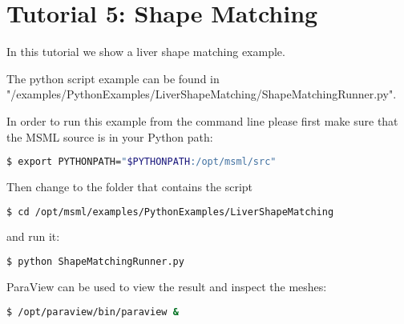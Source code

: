 \chapter{Tutorial 5: Shape Matching}

In this tutorial we show a liver shape matching example.

The python script example can be found in "/examples/PythonExamples/LiverShapeMatching/ShapeMatchingRunner.py". 

In order to run this example from the command line please first make sure that the MSML source is in your Python path:
\begin{lstlisting}[language=sh, breaklines=true]
$ export PYTHONPATH="$PYTHONPATH:/opt/msml/src"
\end{lstlisting}

Then change to the folder that contains the script

\begin{lstlisting}[language=sh, breaklines=true]
$ cd /opt/msml/examples/PythonExamples/LiverShapeMatching
\end{lstlisting}

and run it:

\begin{lstlisting}[language=sh, breaklines=true]
$ python ShapeMatchingRunner.py
\end{lstlisting}

ParaView can be used to view the result and inspect the meshes:
\begin{lstlisting}[language=sh, breaklines=true]
$ /opt/paraview/bin/paraview &
\end{lstlisting}